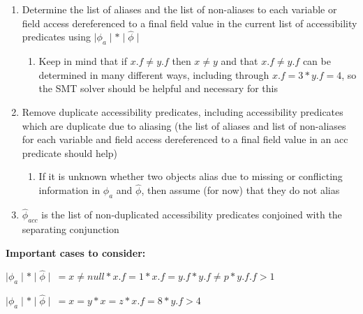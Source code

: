 \documentclass {article}
\newcommand{\fphi}{\widehat{\phi}}
\begin{document}
\begin{enumerate}
\begin{enumerate}
	\end{enumerate}
\item Determine the list of aliases and the list of non-aliases to each variable or field access dereferenced to a final field value in the current list of accessibility predicates using $\mid \phi_a \mid \ast \mid \fphi \mid$
	\begin{enumerate}
	\item Keep in mind that if $x.f \neq y.f$ then $x \neq y$ and that $x.f \neq y.f$ can be determined in many different ways, including through $x.f = 3 * y.f = 4$, so the SMT solver should be helpful and necessary for this
	\end{enumerate}
\item Remove duplicate accessibility predicates, including accessibility predicates which are duplicate due to aliasing (the list of aliases and list of non-aliases for each variable and field access dereferenced to a final field value in an acc predicate should help)
	\begin{enumerate}
	\item If it is unknown whether two objects alias due to missing or conflicting information in $\phi_a$ and $\fphi$, then assume (for now) that they do not alias
	\end{enumerate}
\item $\fphi_{acc}$ is the list of non-duplicated accessibility predicates conjoined with the separating conjunction
\end{enumerate}

\textbf{Important cases to consider:}

$\mid \phi_a \mid \ast \mid \fphi \mid \ = x \neq null \ast x.f = 1 \ast x.f = y.f \ast y.f \neq p \ast y.f.f > 1$

$\mid \phi_a \mid \ast \mid \fphi \mid \ = x = y \ast x = z \ast x.f = 8 \ast y.f > 4$
\end{document}

